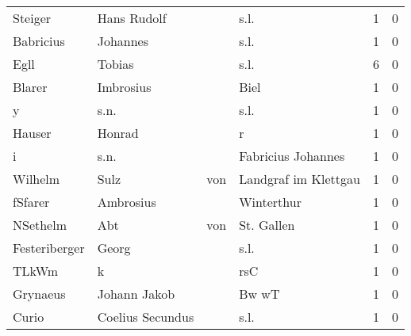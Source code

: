 \documentclass[10pt,a4paper,landscape]{article}
\begin{document}
\begin{longtable}{llllrr}
                  Steiger &                        Hans Rudolf &             &                                        s.l. &          1 &         0 \\
                Babricius &                           Johannes &             &                                        s.l. &          1 &         0 \\
                     Egll &                             Tobias &             &                                        s.l. &          6 &         0 \\
                   Blarer &                          Imbrosius &             &                                        Biel &          1 &         0 \\
                        y &                               s.n. &             &                                        s.l. &          1 &         0 \\
                   Hauser &                             Honrad &             &                                           r &          1 &         0 \\
                        i &                               s.n. &             &                          Fabricius Johannes &          1 &         0 \\
                  Wilhelm &                               Sulz &         von &                        Landgraf im Klettgau &          1 &         0 \\
                  fSfarer &                          Ambrosius &             &                                  Winterthur &          1 &         0 \\
                 NSethelm &                                Abt &         von &                                  St. Gallen &          1 &         0 \\
            Festeriberger &                              Georg &             &                                        s.l. &          1 &         0 \\
                    TLkWm &                                  k &             &                                         rsC &          1 &         0 \\
                 Grynaeus &                       Johann Jakob &             &                                       Bw wT &          1 &         0 \\
                    Curio &                   Coelius Secundus &             &                                        s.l. &          1 &         0 \\

\end{longtable}
\end{document}
